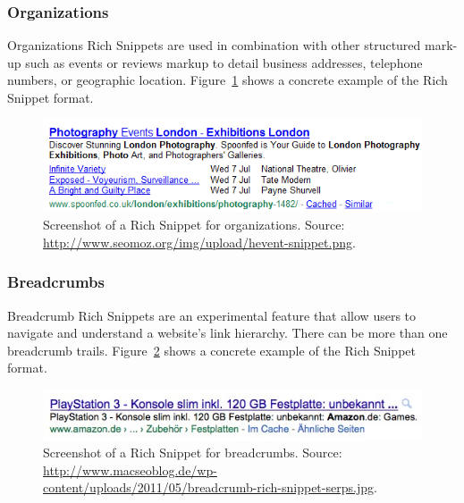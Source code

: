 \documentclass[12pt]{article}
\begin{document}
\subsubsection{Organizations}
Organizations Rich Snippets are used in combination with other structured mark-up such as events or reviews markup to detail business addresses, telephone numbers, or geographic location. Figure~\ref{fig:rich-snippets-organizations} shows a concrete example of the Rich Snippet format.
\begin{figure}[htbp!]
\begin{center}
  \includegraphics[width=0.75\linewidth]{./resources/rich-snippets-organizations.png}
    \caption[Screenshot of a Rich Snippet for organizations.]{Screenshot of a Rich Snippet for organizations. Source: \url{http://www.seomoz.org/img/upload/hevent-snippet.png}.}
  \label{fig:rich-snippets-organizations}
  \end{center}  
\end{figure}

\subsubsection{Breadcrumbs}
Breadcrumb Rich Snippets are an experimental feature that allow users to navigate and understand a website's link hierarchy. There can be more than one breadcrumb trails. Figure~\ref{fig:rich-snippets-breadcrumbs} shows a concrete example of the Rich Snippet format.
\begin{figure}[htbp!]
\begin{center}
  \includegraphics[width=0.75\linewidth]{./resources/rich-snippets-breadcrumbs.jpg}
    \caption[Screenshot of a Rich Snippet for breadcrumbs.]{Screenshot of a Rich Snippet for breadcrumbs. Source: \url{http://www.macseoblog.de/wp-content/uploads/2011/05/breadcrumb-rich-snippet-serps.jpg}.}
  \label{fig:rich-snippets-breadcrumbs}
  \end{center}  
\end{figure}
\end{document}
